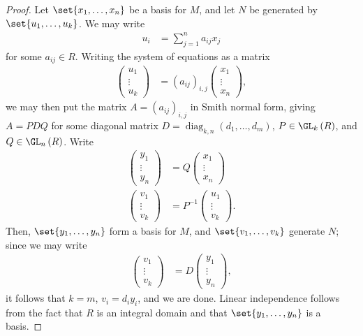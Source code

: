 \documentclass[10pt]{mypackage}
\begin{document}
\begin{proof}
  Let $\set{x_1,\dots,x_n}$ be a basis for $M$, and let $N$ be generated by $\set{u_1,\dots,u_k}$. We may write
  \begin{align*}
    u_i &= \sum_{j=1}^{n} a_{ij}x_j
  \end{align*}
  for some $a_{ij}\in R$. Writing the system of equations as a matrix
  \begin{align*}
    \begin{pmatrix}u_1\\\vdots\\u_k\end{pmatrix} &= \left( a_{ij} \right)_{i,j} \begin{pmatrix}x_1\\\vdots\\x_n\end{pmatrix},
  \end{align*}
  we may then put the matrix $A = \left( a_{ij} \right)_{i,j}$ in Smith normal form, giving $A = PDQ$ for some diagonal matrix $D = \operatorname{diag}_{k,n}\left( d_1,\dots,d_m \right)$, $P\in \GL_k\left( R \right)$, and $Q\in \GL_n\left( R \right)$. Write
  \begin{align*}
    \begin{pmatrix}y_1\\\vdots\\y_n\end{pmatrix} &= Q \begin{pmatrix}x_1\\\vdots\\x_n\end{pmatrix}\\
    \begin{pmatrix}v_1\\\vdots\\v_k\end{pmatrix} &= P^{-1} \begin{pmatrix}u_1\\\vdots\\v_k\end{pmatrix}.
  \end{align*}
  Then, $\set{y_1,\dots,y_n}$ form a basis for $M$, and $\set{v_1,\dots,v_k}$ generate $N$; since we may write
  \begin{align*}
    \begin{pmatrix}v_1\\\vdots\\v_k\end{pmatrix} &= D \begin{pmatrix}y_1\\\vdots\\y_n\end{pmatrix},
  \end{align*}
  it follows that $k = m$, $v_i = d_iy_i$, and we are done. Linear independence follows from the fact that $R$ is an integral domain and that $\set{y_1,\dots,y_n}$ is a basis.
\end{proof}
\end{document}
